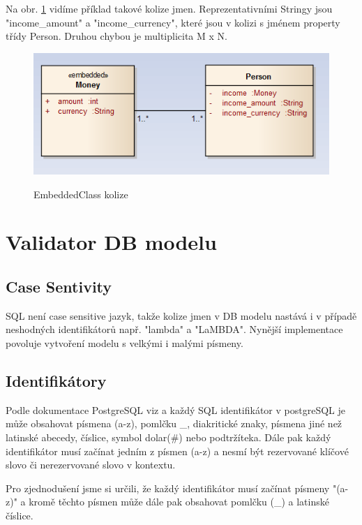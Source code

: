 \documentclass{article}
\begin{document}
Na obr. \ref{pict:embedded-collision} vidíme příklad takové kolize jmen.
Reprezentativními Stringy jsou "income\_amount" a "income\_currency", které jsou
v kolizi s jménem property třídy Person. Druhou chybou je multiplicita M x N.
\begin{figure}[t]
	\begin{center}
	\label{pict:embedded-collision}		             
    \includegraphics[scale=1.0]{../images/embedded_collision_example.png}
	\caption{EmbeddedClass kolize}
	\end{center}			     
\end{figure}


\section{Validator DB modelu}
\subsection {Case Sentivity} SQL není case sensitive jazyk, takže kolize jmen v
DB modelu nastává i v případě neshodných identifikátorů např. "lambda" a
"LaMBDA". Nynější implementace povoluje vytvoření modelu s velkými i malými
písmeny.
\subsection{Identifikátory}
Podle dokumentace PostgreSQL viz \cite{www:postgreSQL:identifiers} a
\cite{www:postgreSQL:keywords} každý SQL identifikátor v postgreSQL je může
obsahovat písmena (a-z), pomlčku \_, diakritické znaky, písmena jiné než
latinské abecedy, číslice, symbol dolar(\#) nebo podtržíteka. Dále pak každý
identifikátor musí začínat jedním z písmen (a-z) a nesmí být rezervované
klíčové slovo či nerezervované slovo v kontextu.

Pro zjednodušení jsme si určili, že každý identifikátor musí začínat písmeny
"(a-z)" a kromě těchto písmen může dále pak obsahovat pomlčku (\_) a
latinské číslice. \\
\end{document}
